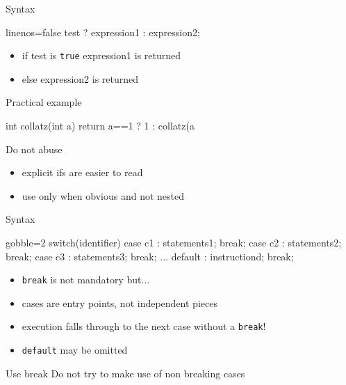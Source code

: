 \begin{frame}[fragile]
  \begin{block}{Syntax}
    \begin{cppcode*}{linenos=false}
      test ? expression1 : expression2;
    \end{cppcode*}
    \vspace{-0.2cm}
    \begin{itemize}
      \item if test is \texttt{true} expression1 is returned
      \item else expression2 is returned
    \end{itemize}
  \end{block}
  \pause
  \begin{exampleblock}{Practical example}
    \begin{cppcode*}{}
      int collatz(int a) {
        return a==1 ? 1 : collatz(a%
      }
    \end{cppcode*}
  \end{exampleblock}
  \pause
  \begin{alertblock}{Do not abuse}
    \begin{itemize}
      \item explicit ifs are easier to read \\
      \item use only when obvious and not nested
    \end{itemize}
  \end{alertblock}
\end{frame}

\begin{frame}[fragile]
  \begin{block}{Syntax}
    \begin{cppcode*}{gobble=2}
      switch(identifier) {
        case c1 : statements1; break;
        case c2 : statements2; break;
        case c3 : statements3; break;
        ...
        default : instructiond; break;
      }
    \end{cppcode*}
    \begin{itemize}
      \item \texttt{break} is not mandatory but...
      \item cases are entry points, not independent pieces
      \item execution falls through to the next case without a \texttt{break}!
      \item \texttt{default} may be omitted
    \end{itemize}
  \end{block}
  \pause
  \begin{alertblock}{Use break}
    Do not try to make use of non breaking cases
  \end{alertblock}
\end{frame}

